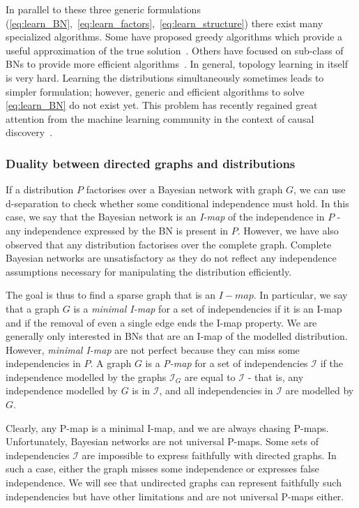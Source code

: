 In parallel to these three generic formulations (\ref{eq:learn_BN},~\ref{eq:learn_factors},~\ref{eq:learn_structure}) there exist many specialized algorithms. Some have proposed greedy algorithms which provide a useful approximation of the true solution~\citep{tsamardinos2006max}. Others have focused on sub-class of BNs to provide more efficient algorithms~\citep{cooper1992Bayesian, chow1968approximating}. In general, topology learning in itself is very hard. Learning the distributions simultaneously sometimes leads to simpler formulation; however, generic and efficient algorithms to solve \eqref{eq:learn_BN} do not exist yet. This problem has recently regained great attention from the machine learning community in the context of causal discovery~\citep{khemakhem_causal_2020, balgi2022counterfactual, vowels2021d, brouillard2020differentiable}.


\subsubsection{Duality between directed graphs and distributions}
If a distribution $P$ factorises over a Bayesian network with graph $G$, we can use d-separation to check whether some conditional independence must hold. In this case, we say that the Bayesian network is an \textit{I-map} of the independence in $P$ - any independence expressed by the BN is present in $P$. However, we have also observed that any distribution factorises over the complete graph. Complete Bayesian networks are unsatisfactory as they do not reflect any independence assumptions necessary for manipulating the distribution efficiently.

The goal is thus to find a sparse graph that is an $I-map$. In particular, we say that a graph $G$ is a \textit{minimal I-map} for a set of independencies if it is an I-map and if the removal of even a single edge ends the I-map property. We are generally only interested in BNs that are an I-map of the modelled distribution. However, \textit{minimal I-map} are not perfect because they can miss some independencies in $P$. A graph $G$ is a \textit{P-map} for a set of independencies $\mathcal{I}$ if the independence modelled by the graphs $\mathcal{I}_G$ are equal to $\mathcal{I}$ - that is, any independence modelled by $G$ is in $\mathcal{I}$, and all independencies in $\mathcal{I}$ are modelled by  $G$.

Clearly, any P-map is a minimal I-map, and we are always chasing P-maps. Unfortunately, Bayesian networks are not universal P-maps. Some sets of independencies $\mathcal{I}$ are impossible to express faithfully with directed graphs. In such a case, either the graph misses some independence or expresses false independence. We will see that undirected graphs can represent faithfully such independencies but have other limitations and are not universal P-maps either.
